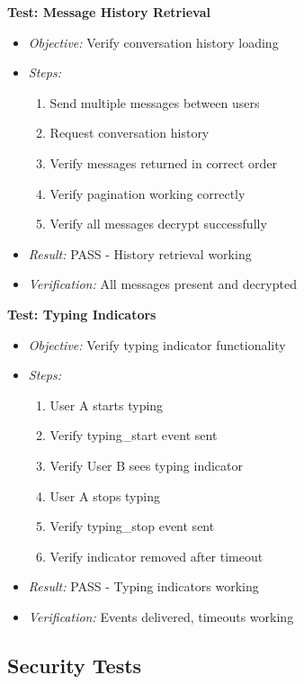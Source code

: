 \textbf{Test: Message History Retrieval}
\begin{itemize}
    \item \textit{Objective:} Verify conversation history loading
    \item \textit{Steps:}
    \begin{enumerate}
        \item Send multiple messages between users
        \item Request conversation history
        \item Verify messages returned in correct order
        \item Verify pagination working correctly
        \item Verify all messages decrypt successfully
    \end{enumerate}
    \item \textit{Result:} PASS - History retrieval working
    \item \textit{Verification:} All messages present and decrypted
\end{itemize}

\textbf{Test: Typing Indicators}
\begin{itemize}
    \item \textit{Objective:} Verify typing indicator functionality
    \item \textit{Steps:}
    \begin{enumerate}
        \item User A starts typing
        \item Verify typing\_start event sent
        \item Verify User B sees typing indicator
        \item User A stops typing
        \item Verify typing\_stop event sent
        \item Verify indicator removed after timeout
    \end{enumerate}
    \item \textit{Result:} PASS - Typing indicators working
    \item \textit{Verification:} Events delivered, timeouts working
\end{itemize}

\subsection{Security Tests}

